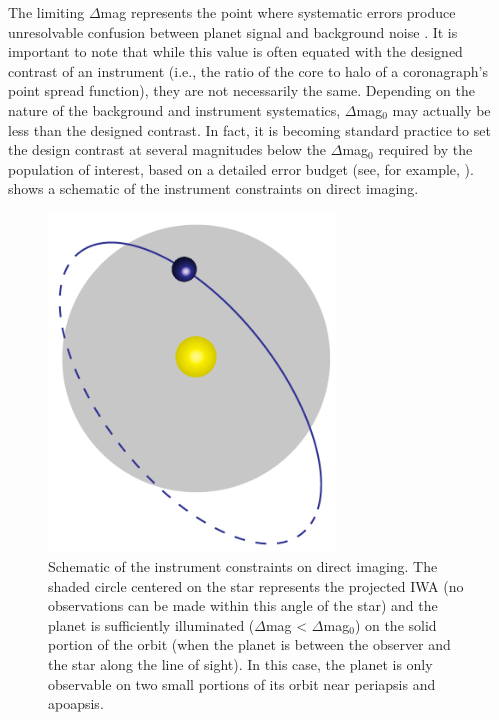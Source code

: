 The limiting $\Delta$mag represents the point where systematic errors produce unresolvable confusion between planet signal and background noise \citep{brown2005}.   It is important to note that while this value is often equated with the designed contrast of an instrument (i.e., the ratio of the core to halo of a coronagraph's point spread function), they are not necessarily the same.  Depending on the nature of the background and instrument systematics, $\Delta$mag$_0$ may actually be less than the designed contrast.  In fact, it is becoming standard practice to set the design contrast at several magnitudes below the $\Delta$mag$_0$ required by the population of interest, based on a detailed error budget (see, for example, \citet{shaklan2010error}).   shows a schematic of the instrument constraints on direct imaging.
\begin{figure}[ht]
 \center
 \includegraphics[width=3in]{./figures/imagingConstraintsSchem}
  \caption[Imaging constraints diagram]{ \label{fig:imagingConstraintsSchem} Schematic of the instrument constraints on direct imaging.  The shaded circle centered on the star represents the projected IWA (no observations can be made within this angle of the star) and the planet is sufficiently illuminated ($\Delta$mag  < $\Delta$mag$_0$) on the solid portion of the orbit (when the planet is between the observer and the star along the line of sight).  In this case, the planet is only observable on two small portions of its orbit near periapsis and apoapsis.}
 \end{figure}

